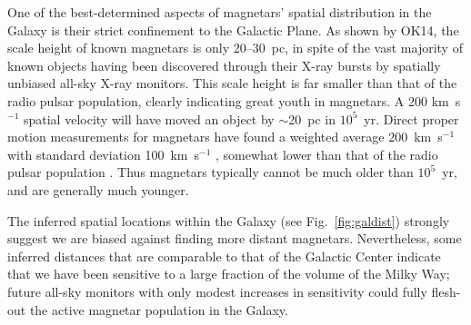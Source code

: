 One of the best-determined aspects of magnetars'  spatial distribution in the Galaxy is their strict confinement
to the Galactic Plane.  As shown by OK14, the scale height of known magnetars is only 20--30~pc, in spite
of the vast majority of known objects having been discovered through their X-ray bursts by 
spatially unbiased all-sky X-ray monitors.  
This scale height is far smaller than that of the radio pulsar
population, clearly indicating great youth in magnetars.  A
200 km~s$^{-1}$ spatial velocity will have moved an object by $\sim$20~pc in $10^5$~yr.  
Direct proper motion
measurements for magnetars have found a
weighted average 200~km~s$^{-1}$ with standard deviation 100~km~s$^{-1}$
\citep{tck13}, somewhat lower than that of the radio pulsar population \citep[e.g.][]{acc02,bfg+03,fk06}.
Thus magnetars typically cannot be much older than $10^5$~yr, and are generally much younger.  



The inferred spatial locations within the Galaxy (see Fig.~\ref{fig:galdist}) strongly suggest we are biased
against finding more distant magnetars. 
Nevertheless, some inferred
distances that are comparable to that of the Galactic Center indicate that
we have been sensitive to a large fraction of the volume of the Milky Way; future all-sky monitors
with only modest increases in sensitivity could fully flesh-out the active magnetar population in the Galaxy.

